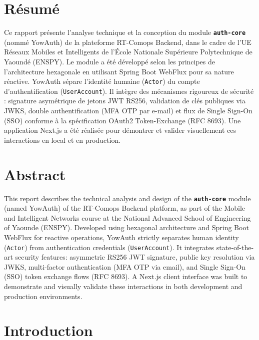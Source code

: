 \documentclass[11pt,a4paper,oneside]{report}
\newcommand{\code}[1]{\texttt{\small #1}}
\begin{document}
\chapter*{Résumé}
Ce rapport présente l'analyse technique et la conception du module \textbf{\code{auth-core}} (nommé YowAuth) de la plateforme RT-Comops Backend, dans le cadre de l'UE Réseaux Mobiles et Intelligents de l'École Nationale Supérieure Polytechnique de Yaoundé (ENSPY). Le module a été développé selon les principes de l'architecture hexagonale en utilisant Spring Boot WebFlux pour sa nature réactive. YowAuth sépare l'identité humaine (\code{Actor}) du compte d'authentification (\code{UserAccount}). Il intègre des mécanismes rigoureux de sécurité : signature asymétrique de jetons JWT RS256, validation de clés publiques via JWKS, double authentification (MFA OTP par e-mail) et flux de Single Sign-On (SSO) conforme à la spécification OAuth2 Token-Exchange (RFC 8693). Une application Next.js a été réalisée pour démontrer et valider visuellement ces interactions en local et en production.

\vspace{1.5cm}

\chapter*{Abstract}
This report describes the technical analysis and design of the \textbf{\code{auth-core}} module (named YowAuth) of the RT-Comops Backend platform, as part of the Mobile and Intelligent Networks course at the National Advanced School of Engineering of Yaounde (ENSPY). Developed using hexagonal architecture and Spring Boot WebFlux for reactive operations, YowAuth strictly separates human identity (\code{Actor}) from authentication credentials (\code{UserAccount}). It integrates state-of-the-art security features: asymmetric RS256 JWT signature, public key resolution via JWKS, multi-factor authentication (MFA OTP via email), and Single Sign-On (SSO) token exchange flows (RFC 8693). A Next.js client interface was built to demonstrate and visually validate these interactions in both development and production environments.

\tableofcontents
\listoffigures
\listoftables
\cleardoublepage


\chapter{Introduction}
\end{document}
